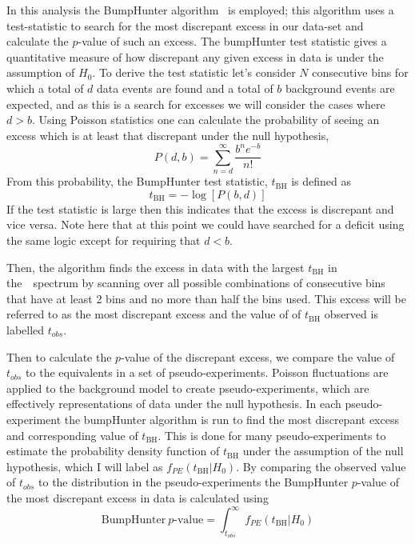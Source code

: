 In this analysis the BumpHunter algorithm~\cite{dibjet-bh} is employed;
this algorithm uses a test-statistic to 
search for the most discrepant excess in our data-set
and calculate the $p$-value of such an excess.
The bumpHunter test statistic gives a quantitative measure of how discrepant any given excess in data is
under the assumption of $H_0$.
To derive the test statistic let's consider $N$ consecutive bins for which
a total of $d$ data events are found and a total of $b$ background events are expected,
and as this is a search for excesses we will consider the cases where $d > b$.
Using Poisson statistics one can calculate the probability of seeing an excess which is at least that discrepant
under the null hypothesis,
\begin{equation}
  P(d,b) = \sum_{n=d}^{\infty} \frac{b^ne^{-b}}{n!}
\end{equation}
From this probability, the BumpHunter test statistic, $t_{\text{BH}}$ is defined as
\begin{equation}
 t_{\text{BH}} = -\log{[P(b,d)]}
\end{equation}
If the test statistic is large then this indicates that the excess is discrepant and vice versa.
Note here that at this point we could have searched for a deficit using the same logic except for requiring that $ d < b$.

Then, the algorithm finds the excess in data with the largest $t_{\text{BH}}$ in the~\mjj~spectrum by scanning over all
possible combinations of consecutive bins that have at least 2 bins and no more than half the bins used.
This excess will be referred to as the most discrepant excess and the value of of $t_{\text{BH}}$ observed is labelled $t_{obs}$.

Then to calculate the $p$-value of the discrepant excess, we compare the value of $t_{obs}$ to the equivalents in a set of pseudo-experiments.
Poisson fluctuations are applied to the background model to create pseudo-experiments, which are effectively representations of data under the null hypothesis.
In each pseudo-experiment the bumpHunter algorithm is run to find the most discrepant excess and corresponding value of $t_{\text{BH}}$.
This is done for many pseudo-experiments to estimate the probability density function of $t_{\text{BH}}$ under the assumption of the null hypothesis,
which I will label as $f_{PE}(t_{\text{BH}}| H_0)$.
By comparing the observed value of $t_{obs}$ to the distribution in the pseudo-experiments
the BumpHunter $p$-value of the most discrepant excess in data is calculated using
\begin{equation}
  \text{BumpHunter}~p\text{-value} = \int_{t_{obs}}^\infty f_{PE}(t_{\text{BH}}| H_0)
\end{equation}

